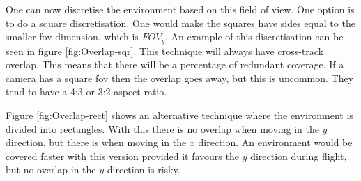 One can now discretise the environment based on this field of view. One option is to do a square discretisation. One would make the squares have sides equal to the smaller \acs{fov} dimension, which is $FOV_y$. An example of this discretisation can be seen in figure \ref{fig:Overlap-sqr}. This technique will always have cross-track overlap. This means that there will be a percentage of redundant coverage. If a camera has a square \acs{fov} then the overlap goes away, but this is uncommon. They tend to have a 4:3 or 3:2 aspect ratio.

Figure \ref{fig:Overlap-rect} shows an alternative technique where the environment is divided into rectangles. With this there is no overlap when moving in the $y$ direction, but there is when moving in the $x$ direction. An environment would be covered faster with this version provided it favours the $y$ direction during flight, but no overlap in the $y$ direction is risky.

